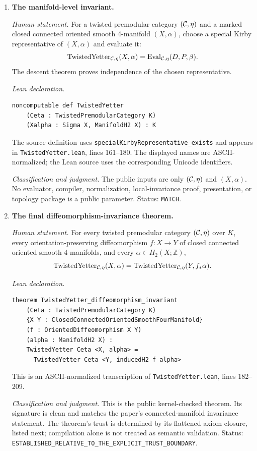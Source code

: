 \begin{enumerate}[label=\textbf{O\arabic*.},leftmargin=*]

\item \textbf{The manifold-level invariant.}

\emph{Human statement.}
For a twisted premodular category $(\mathcal{C},\eta)$ and a marked closed connected
oriented smooth 4-manifold $(X,\alpha)$, choose a special Kirby
representative of $(X,\alpha)$ and evaluate it:
\[
 \operatorname{TwistedYetter}_{\mathcal{C},\eta}(X,\alpha)
 =\operatorname{Eval}_{\mathcal{C},\eta}(D,P,\beta).
\]
The descent theorem proves independence of the chosen representative.

\emph{Lean declaration.}
\begin{verbatim}
noncomputable def TwistedYetter
    (Ceta : TwistedPremodularCategory K)
    (Xalpha : Sigma X, ManifoldH2 X) : K
\end{verbatim}
The source definition uses
\nolinkurl{specialKirbyRepresentative_exists} and appears in
\nolinkurl{TwistedYetter.lean}, lines 161--180.  The displayed names are
ASCII-normalized; the Lean source uses the corresponding Unicode identifiers.

\emph{Classification and judgment.}
The public inputs are only $(\mathcal{C},\eta)$ and $(X,\alpha)$.  No evaluator,
compiler, normalization, local-invariance proof, presentation, or topology
package is a public parameter.  Status: \texttt{MATCH}.

\item \textbf{The final diffeomorphism-invariance theorem.}

\emph{Human statement.}
For every twisted premodular category $(\mathcal{C},\eta)$ over $K$, every
orientation-preserving diffeomorphism $f\colon X\to Y$ of closed connected
oriented smooth 4-manifolds, and every
$\alpha\in H_2(X;\mathbb Z)$,
\[
 \operatorname{TwistedYetter}_{\mathcal{C},\eta}(X,\alpha)
 =
 \operatorname{TwistedYetter}_{\mathcal{C},\eta}(Y,f_*\alpha).
\]

\emph{Lean declaration.}
\begin{verbatim}
theorem TwistedYetter_diffeomorphism_invariant
    (Ceta : TwistedPremodularCategory K)
    {X Y : ClosedConnectedOrientedSmoothFourManifold}
    (f : OrientedDiffeomorphism X Y)
    (alpha : ManifoldH2 X) :
    TwistedYetter Ceta <X, alpha> =
      TwistedYetter Ceta <Y, inducedH2 f alpha>
\end{verbatim}
This is an ASCII-normalized transcription of
\nolinkurl{TwistedYetter.lean}, lines 182--209.

\emph{Classification and judgment.}
This is the public kernel-checked theorem.  Its signature is clean and matches
the paper's connected-manifold invariance statement.  The theorem's trust is
determined by its flattened axiom closure, listed next; compilation alone is
not treated as semantic validation.  Status:
\nolinkurl{ESTABLISHED_RELATIVE_TO_THE_EXPLICIT_TRUST_BOUNDARY}.

\end{enumerate}


